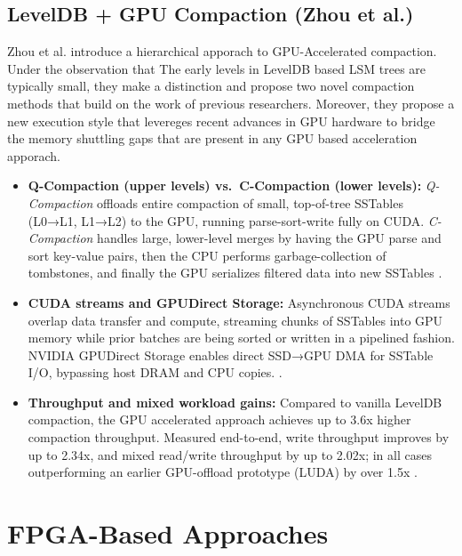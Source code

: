 \documentclass[sigconf]{acmart}
\begin{document}
        \subsection{LevelDB + GPU Compaction (Zhou et al.)}
        Zhou et al. introduce a hierarchical apporach to GPU-Accelerated compaction. Under the observation that The early levels in LevelDB based LSM trees are typically small, they make a distinction and propose two novel compaction methods that build on the work of previous researchers. 
        Moreover, they propose a new execution style that levereges recent advances in GPU hardware to bridge the memory shuttling gaps that are present in any GPU based acceleration apporach.
        
        \begin{itemize}
          \item \textbf{Q-Compaction (upper levels) vs.\ C-Compaction (lower levels):}
            \emph{Q-Compaction} offloads entire compaction of small, top-of-tree SSTables (L0→L1, L1→L2) to the GPU, running parse-sort-write fully on CUDA.
            \emph{C-Compaction} handles large, lower-level merges by having the GPU parse and sort key-value pairs, then the CPU performs garbage-collection of tombstones, and finally the GPU serializes filtered data into new SSTables \cite{zhou2024gpuaccel}.
          \item \textbf{CUDA streams and GPUDirect Storage:}
            Asynchronous CUDA streams overlap data transfer and compute, streaming chunks of SSTables into GPU memory while prior batches are being sorted or written in a pipelined fashion.
            NVIDIA GPUDirect Storage enables direct SSD→GPU DMA for SSTable I/O, bypassing host DRAM and CPU copies. \cite{zhou2024gpuaccel}.
          \item \textbf{Throughput and mixed workload gains:}
            Compared to vanilla LevelDB compaction, the GPU accelerated approach achieves up to 3.6x higher compaction throughput.
            Measured end-to-end, write throughput improves by up to 2.34x, and mixed read/write throughput by up to 2.02x; in all cases outperforming an earlier GPU-offload prototype (LUDA) by over 1.5x \cite{zhou2024gpuaccel}.
        \end{itemize}

\section{FPGA-Based Approaches}
\end{document}
